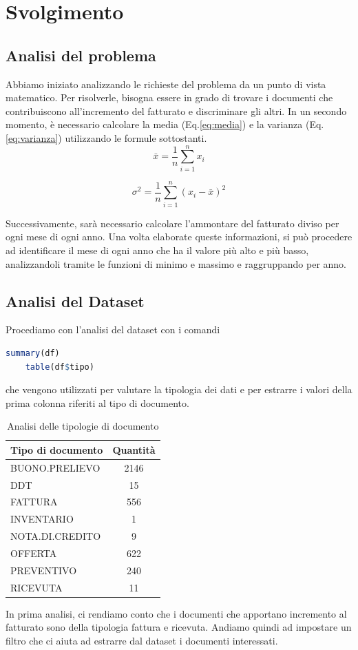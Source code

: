 \section{Svolgimento}
\subsection{Analisi del problema}
Abbiamo iniziato analizzando le richieste del problema da un punto di vista matematico. Per risolverle, bisogna essere in grado di trovare i documenti che contribuiscono all'incremento del fatturato e discriminare gli altri. In un secondo momento, è necessario calcolare la media (Eq.\ref{eq:media}) e la varianza (Eq.\ref{eq:varianza}) utilizzando le formule sottostanti.
\begin{equation}
    \bar{x} = \frac{1}{n} \sum_{i=1}^{n} x_i
    \label{eq:media}
    \end{equation}
    
    \begin{equation}
    \sigma^2 = \frac{1}{n} \sum_{i=1}^{n} (x_i - \bar{x})^2
    \label{eq:varianza}
    \end{equation}
    
Successivamente, sarà necessario calcolare l'ammontare del fatturato diviso per ogni mese di ogni anno. Una volta elaborate queste informazioni, si può procedere ad identificare il mese di ogni anno che ha il valore più alto e più basso, analizzandoli tramite le funzioni di minimo e massimo e raggruppando per anno.
\subsection{Analisi del Dataset}
Procediamo con l'analisi del dataset con i comandi
\begin{lstlisting}[language=R]
    summary(df)
    table(df$tipo)
\end{lstlisting}
che vengono utilizzati per valutare la tipologia dei dati e per estrarre i valori della prima colonna riferiti al tipo di documento.
\begin{table}[ht]
\centering
\begin{tabular}{|l|c|}
\hline
Tipo di documento & Quantità \\
\hline
BUONO.PRELIEVO & 2146 \\
DDT & 15 \\
FATTURA & 556 \\
INVENTARIO & 1 \\
NOTA.DI.CREDITO & 9 \\
OFFERTA & 622 \\
PREVENTIVO & 240 \\
RICEVUTA & 11 \\
\hline
\end{tabular}
\caption{Analisi delle tipologie di documento}
\label{tab:esempio}
\end{table}
In prima analisi, ci rendiamo conto che i documenti che apportano incremento al fatturato sono della tipologia fattura e ricevuta. Andiamo quindi ad impostare un filtro che ci aiuta ad estrarre dal dataset i documenti interessati.
